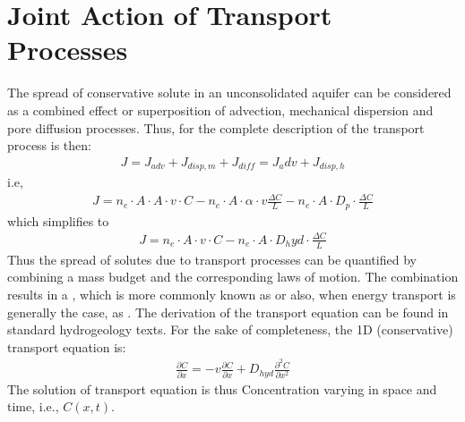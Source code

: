 \documentclass[letterpaper,10pt,english]{jupyterBook}
\begin{document}
\section{Joint Action of Transport Processes}
\label{\detokenize{content/transport/L9/21_conservative_transport:joint-action-of-transport-processes}}
\sphinxAtStartPar
The spread of conservative solute in an unconsolidated aquifer can be considered as a combined effect or superposition of advection, mechanical dispersion and pore diffusion processes. Thus, for the complete description of the transport process is then:
\begin{equation*}
\begin{split}
J = J_{adv} + J_{disp, m} + J_{diff} = J_adv + J_{disp, h}
\end{split}
\end{equation*}
\sphinxAtStartPar
i.e,
\begin{equation*}
\begin{split}
J = n_e \cdot A \cdot A \cdot v \cdot C - n_e \cdot A\cdot\alpha \cdot v 
\frac{\Delta C}{L} - n_e \cdot A\cdot D_p \cdot \frac{\Delta C}{L}
\end{split}
\end{equation*}
\sphinxAtStartPar
which simplifies to
\begin{equation*}
\begin{split}
J = n_e \cdot A\cdot v \cdot C - n_e \cdot A \cdot D_hyd \cdot\frac{\Delta C}{L}
\end{split}
\end{equation*}
\sphinxAtStartPar
Thus the spread of solutes due to transport processes can be quantified by combining a mass budget and the corresponding laws of motion. The combination results in a , which is more commonly known as  or also, when energy transport is generally the case,  as . The derivation of the transport equation can be found in standard hydrogeology texts. For the sake of completeness, the 1D (conservative) transport equation is:
\begin{equation*}
\begin{split}
\frac{\partial C}{\partial x} = - v\frac{\partial C}{\partial x} + D_{hyd}\frac{\partial^2 C}{\partial x^2}
\end{split}
\end{equation*}
\sphinxAtStartPar
The solution of transport equation is thus Concentration varying in space and time, i.e., \(C(x,t)\).
\end{document}

